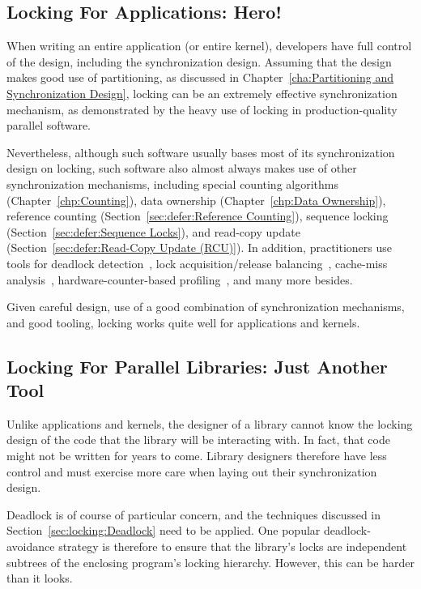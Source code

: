 \subsection{Locking For Applications: Hero!}
\label{sec:locking:Locking For Applications: Hero!}

When writing an entire application (or entire kernel), developers have
full control of the design, including the synchronization design.
Assuming that the design makes good use of partitioning, as discussed in
Chapter~\ref{cha:Partitioning and Synchronization Design}, locking
can be an extremely effective synchronization mechanism, as demonstrated
by the heavy use of locking in production-quality parallel software.

Nevertheless, although such software usually bases most of its
synchronization design on locking, such software also almost always
makes use of other synchronization mechanisms, including
special counting algorithms (Chapter~\ref{chp:Counting}),
data ownership (Chapter~\ref{chp:Data Ownership}),
reference counting (Section~\ref{sec:defer:Reference Counting}),
sequence locking (Section~\ref{sec:defer:Sequence Locks}), and
read-copy update (Section~\ref{sec:defer:Read-Copy Update (RCU)}).
In addition, practitioners use tools for deadlock
detection~\cite{JonathanCorbet2006lockdep},
lock acquisition/release balancing~\cite{JonathanCorbet2004sparse},
cache-miss analysis~\cite{ValgrindHomePage},
hardware-counter-based profiling~\cite{LinuxKernelPerfWiki,OProfileHomePage},
and many more besides.

Given careful design, use of a good combination of synchronization
mechanisms, and good tooling, locking works quite well for applications
and kernels.

\subsection{Locking For Parallel Libraries: Just Another Tool}
\label{sec:locking:Locking For Parallel Libraries: Just Another Tool}

Unlike applications and kernels, the designer of a library cannot
know the locking design of the code that the library will be interacting
with.
In fact, that code might not be written for years to come.
Library designers therefore have less control and must exercise more
care when laying out their synchronization design.

Deadlock is of course of particular concern, and the techniques discussed
in Section~\ref{sec:locking:Deadlock} need to be applied.
One popular deadlock-avoidance strategy is therefore to ensure that
the library's locks are independent subtrees of the enclosing program's
locking hierarchy.
However, this can be harder than it looks.

